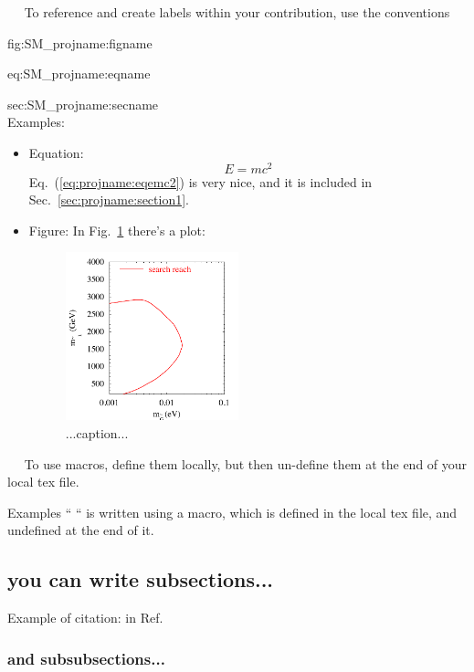 ~\newline~
To reference and create labels within your contribution, use the conventions

fig:SM\_projname:figname

eq:SM\_projname:eqname

sec:SM\_projname:secname\\
Examples:
\begin{itemize}
\item Equation:
  \begin{equation}
    E = m c^2
    \label{eq:projname:eqemc2}
  \end{equation}
  Eq.~(\ref{eq:projname:eqemc2}) is very nice, and it is included in Sec.~\ref{sec:projname:section1}.
\item Figure: In Fig.~\ref{fig:projname:plot1} there's a plot:
\begin{figure}[htbp]
  \begin{center}
    \includegraphics[width=5cm]{Fig1.pdf}
    \caption{...caption...}
    \label{fig:projname:plot1}
  \end{center}
\end{figure}
\end{itemize}
~\newline~
To use macros, define them locally, but then un-define them at the end of your local tex file.

Examples `` \Herwig{} `` is written using a macro, which is defined
in the local tex file, and undefined at the end of it.

\subsection{you can write subsections...}
Example of citation: in Ref.~\cite{Belanger:2014vza}

\subsubsection{and subsubsections...}

\let\Herwig\undefined
\let\Pythia\undefined
\let\Sherpa\undefined
\let\Rivet\undefined
\let\Professor\undefined
\let\eps\undefined
\let\mc\undefined
\let\mr\undefined
\let\mb\undefined
\let\tm\undefined




